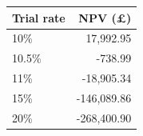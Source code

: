 \begin{tabular}{lr}\toprule
Trial rate & NPV (£)\\\midrule
10\% & 17,992.95\\
10.5\% & -738.99\\
11\% & -18,905.34\\
15\% & -146,089.86\\
20\% & -268,400.90\\
\bottomrule\end{tabular}
